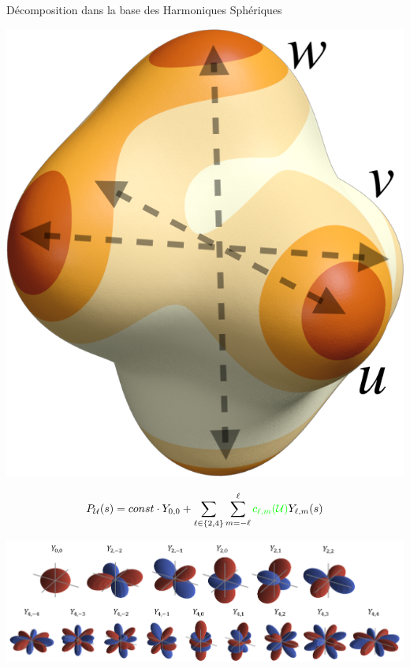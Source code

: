 \documentclass{beamer}
\begin{document}
\begin{frame}{Décomposition dans la base des Harmoniques Sphériques}
\begin{overprint}
    \begin{minipage}[c]{0.19\textwidth}
        \centering
          \vspace*{.5\baselineskip}
          \hfill
        \includegraphics[width=0.8\linewidth]{img_spm_ff/sperical_3dir4_rot.png}
    \end{minipage}
    \begin{minipage}[c]{0.79\textwidth}
        $$P_\mathcal{U}(s) = const \cdot Y_{0, 0} + \sum_{\ell \in \{2, 4\}} \sum_{m = -\ell}^\ell{{\color{green}c_{\ell, m}(\mathcal{U})}Y_{\ell,m}(s)}$$ 
    \end{minipage}
    
    \vspace*{.5\baselineskip}
    \includegraphics[width=\linewidth]{img_spm_ff/all_sph_harm.PNG} 
    \end{overprint}
\end{frame} 
\end{document}
